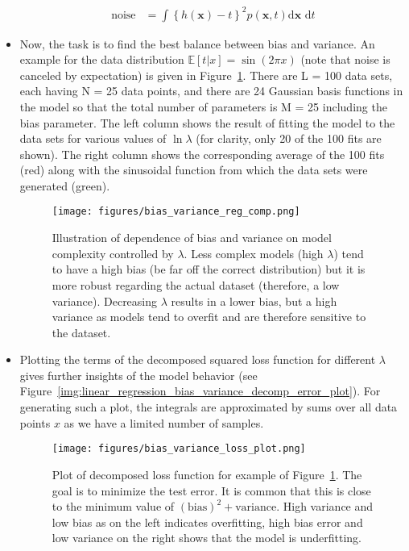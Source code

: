 \begin{itemize}
\begin{equation*}
\begin{split}
			\text{noise} &= \int \left\{h(\bm{x})-t\right\}^2p\left(\bm{x},t\right)\text{d}\bm{x}\text{ d}t
		\end{split}
	\end{equation*}
	\item Now, the task is to find the best balance between bias and variance. An example for the data distribution $\mathbb{E}[t|x]=\sin(2\pi x)$ (note that noise is canceled by expectation) is given in Figure~\ref{img:linear_regression_bias_variance_decomp_example}. There are L = 100 data sets, each having N = 25 data points, and there are 24 Gaussian basis functions in the model so that the total number of parameters is M = 25 including the bias parameter. The left column shows the result of fitting the model to the data sets for various values of $\ln \lambda$ (for clarity, only 20 of the 100 fits are shown). The right column shows the corresponding average of the 100 fits (red) along with the sinusoidal function from which the data sets were generated (green).
	\begin{figure}[ht]
		\centering
		\texttt{[image: figures/bias\_variance\_reg\_comp.png]}
		\caption{Illustration of dependence of bias and variance on model complexity controlled by $\lambda$. Less complex models (high $\lambda$) tend to have a high bias (be far off the correct distribution) but it is more robust regarding the actual dataset (therefore, a low variance). Decreasing $\lambda$ results in a lower bias, but a high variance as models tend to overfit and are therefore sensitive to the dataset.}
		\label{img:linear_regression_bias_variance_decomp_example}
	\end{figure}
	\item Plotting the terms of the decomposed squared loss function for different $\lambda$ gives further insights of the model behavior (see Figure~\ref{img:linear_regression_bias_variance_decomp_error_plot}). For generating such a plot, the integrals are approximated by sums over all data points $x$ as we have a limited number of samples.
	\begin{figure}[ht]
		\centering
		\texttt{[image: figures/bias\_variance\_loss\_plot.png]}
		\caption{Plot of decomposed loss function for example of Figure~\ref{img:linear_regression_bias_variance_decomp_example}. The goal is to minimize the test error. It is common that this is close to the minimum value of $(\text{bias})^2+\text{variance}$. High variance and low bias as on the left indicates overfitting, high bias error and low variance on the right shows that the model is underfitting.}

\end{figure}
\end{itemize}

